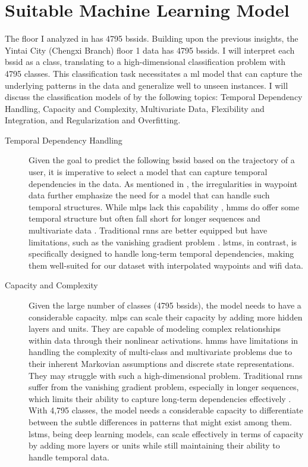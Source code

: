 \chapter{Suitable Machine Learning Model}\label{ch:discuss-ml}

The floor I analyzed in  has 4795 \acp{bssid}.
Building upon the previous insights, the Yintai City (Chengxi Branch) floor 1 data has 4795 \acp{bssid}.
I will interpret each \ac{bssid} as a class, translating to a high-dimensional classification problem with 4795 classes.
This classification task necessitates a \ac{ml} model that can capture the underlying patterns in the data and generalize well to unseen instances.
I will discuss the classification models of  by the following topics: Temporal Dependency Handling, Capacity and Complexity, Multivariate Data, Flexibility and Integration, and Regularization and Overfitting. 

\begin{description}
\item[Temporal Dependency Handling]
Given the goal to predict the following \ac{bssid} based on the trajectory of a user, it is imperative to select a model that can capture temporal dependencies in the data.
As mentioned in , the irregularities in waypoint data further emphasize the need for a model that can handle such temporal structures.
While \acp{mlp} lack this capability \cite{mlp_and_nn}, \acp{hmm} do offer some temporal structure but often fall short for longer sequences and multivariate data \cite{hmm-rabiner-1989}.
Traditional \acp{rnn} are better equipped but have limitations, such as the vanishing gradient problem \cite{rnn_difficulties_2013}.
\acp{lstm}, in contrast, is specifically designed to handle long-term temporal dependencies, making them well-suited for our dataset with interpolated waypoints and \ac{wifi} data.
\end{description}

\begin{description}
\item[Capacity and Complexity]
Given the large number of classes (4795 \acp{bssid}), the model needs to have a considerable capacity.
\acp{mlp} can scale their capacity by adding more hidden layers and units.
They are capable of modeling complex relationships within data through their nonlinear activations.
\acp{hmm} have limitations in handling the complexity of multi-class and multivariate problems due to their inherent Markovian assumptions and discrete state representations. They may struggle with such a high-dimensional problem.
Traditional \acp{rnn} suffer from the vanishing gradient problem, especially in longer sequences, which limits their ability to capture long-term dependencies effectively \cite{rnn_difficulties_2013}.
With 4,795 classes, the model needs a considerable capacity to differentiate between the subtle differences in patterns that might exist among them. 
\acp{lstm}, being deep learning models, can scale effectively in terms of capacity by adding more layers or units while still maintaining their ability to handle temporal data.
\end{description}


